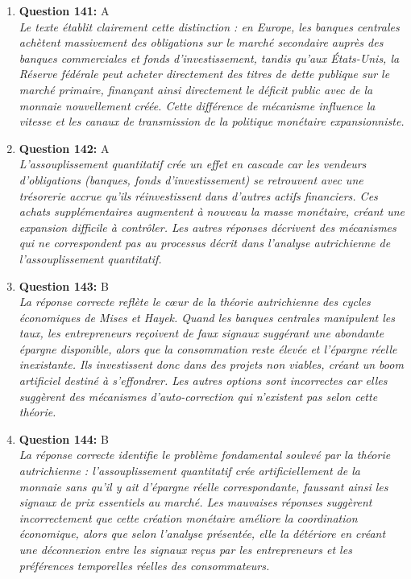 \documentclass[12pt,a4paper]{article}
\begin{document}
\begin{enumerate}
\item \textbf{Question 141:} A
\\ \textit{Le texte établit clairement cette distinction : en Europe, les banques centrales achètent massivement des obligations sur le marché secondaire auprès des banques commerciales et fonds d'investissement, tandis qu'aux États-Unis, la Réserve fédérale peut acheter directement des titres de dette publique sur le marché primaire, finançant ainsi directement le déficit public avec de la monnaie nouvellement créée. Cette différence de mécanisme influence la vitesse et les canaux de transmission de la politique monétaire expansionniste.}

\item \textbf{Question 142:} A
\\ \textit{L'assouplissement quantitatif crée un effet en cascade car les vendeurs d'obligations (banques, fonds d'investissement) se retrouvent avec une trésorerie accrue qu'ils réinvestissent dans d'autres actifs financiers. Ces achats supplémentaires augmentent à nouveau la masse monétaire, créant une expansion difficile à contrôler. Les autres réponses décrivent des mécanismes qui ne correspondent pas au processus décrit dans l'analyse autrichienne de l'assouplissement quantitatif.}

\item \textbf{Question 143:} B
\\ \textit{La réponse correcte reflète le cœur de la théorie autrichienne des cycles économiques de Mises et Hayek. Quand les banques centrales manipulent les taux, les entrepreneurs reçoivent de faux signaux suggérant une abondante épargne disponible, alors que la consommation reste élevée et l'épargne réelle inexistante. Ils investissent donc dans des projets non viables, créant un boom artificiel destiné à s'effondrer. Les autres options sont incorrectes car elles suggèrent des mécanismes d'auto-correction qui n'existent pas selon cette théorie.}

\item \textbf{Question 144:} B
\\ \textit{La réponse correcte identifie le problème fondamental soulevé par la théorie autrichienne : l'assouplissement quantitatif crée artificiellement de la monnaie sans qu'il y ait d'épargne réelle correspondante, faussant ainsi les signaux de prix essentiels au marché. Les mauvaises réponses suggèrent incorrectement que cette création monétaire améliore la coordination économique, alors que selon l'analyse présentée, elle la détériore en créant une déconnexion entre les signaux reçus par les entrepreneurs et les préférences temporelles réelles des consommateurs.}


\end{enumerate}
\end{document}
